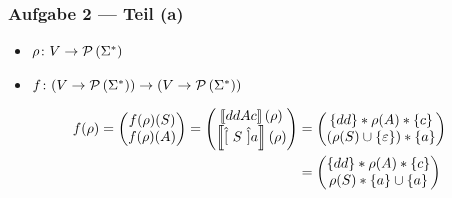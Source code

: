 \documentclass{beamer}
\newcommand{\sem}[1]{\left\llbracket #1 \right\rrbracket}
\begin{document}
\begin{frame} \frametitle{Aufgabe 2 --- Teil (a)}
	\begin{itemize}
		\item $\rho \colon V \to \mathcal{P}\left( \Sigma^\ast \right)$
		\item $f \colon (V \to \mathcal{P}\left( \Sigma^\ast \right)) \to (V \to \mathcal{P}\left( \Sigma^\ast \right))$
	\end{itemize}
	\pause
	\begin{align*}
		f(\rho) = \begin{pmatrix} f(\rho)(S) \\ f(\rho)(A) \end{pmatrix} 
		= \begin{pmatrix} \sem{ddAc}(\rho) \\ \sem{\byp{S}a}(\rho) \end{pmatrix} 
		&= \begin{pmatrix}
			\menge{dd} * \rho(A) * \menge{c} \\ \brackets{\rho(S) \cup \menge{\epsilon}} * \menge{a}
		\end{pmatrix} \\
		&= \begin{pmatrix}
			\menge{dd} * \rho(A) * \menge{c} \\ \rho(S) * \menge{a} \cup \menge{a}
		\end{pmatrix}
	\end{align*}
\end{frame}
\end{document}

